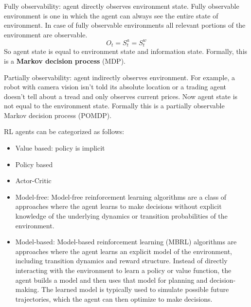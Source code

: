 Fully observability: agent directly observes environment state. Fully observable environment is one in which the agent can always see the entire state of environment. In case of fully observable environments all relevant portions of the environment are observable.
$$O_t=S_t^a=S_t^w$$
So agent state is equal to environment state and information state. Formally, this is a \textbf{Markov decision process} (MDP).

Partially observability: agent indirectly observes environment. For example, a robot with camera vision isn't told its absolute location or a trading agent doesn't tell about a tread and only observes current prices. Now agent state is not equal to the environment state. Formally this is a partially observable Markov decision process (POMDP). 

RL agents can be categorized as follows:
\begin{itemize}
	\item Value based: policy is implicit
	\item Policy based
	\item Actor-Critic
	\item Model-free: Model-free reinforcement learning algorithms are a class of approaches where the agent learns to make decisions without explicit knowledge of the underlying dynamics or transition probabilities of the environment. 
	\item Model-based: Model-based reinforcement learning (MBRL) algorithms are approaches where the agent learns an explicit model of the environment, including transition dynamics and reward structure. Instead of directly interacting with the environment to learn a policy or value function, the agent builds a model and then uses that model for planning and decision-making. The learned model is typically used to simulate possible future trajectories, which the agent can then optimize to make decisions.
\end{itemize}

